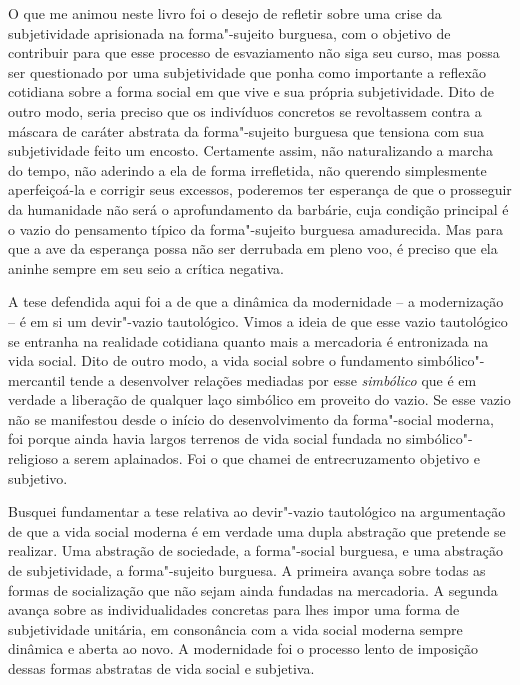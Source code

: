 O que me animou neste livro foi o desejo de refletir sobre uma crise da
subjetividade aprisionada na forma"-sujeito burguesa, com o objetivo de
contribuir para que esse processo de esvaziamento não siga seu curso,
mas possa ser questionado por uma subjetividade que ponha como
importante a reflexão cotidiana sobre a forma social em que vive e sua
própria subjetividade. Dito de outro modo, seria preciso que os
indivíduos concretos se revoltassem contra a máscara de caráter abstrata
da forma"-sujeito burguesa que tensiona com sua subjetividade feito um
encosto. Certamente assim, não naturalizando a marcha do tempo, não
aderindo a ela de forma irrefletida, não querendo simplesmente
aperfeiçoá-la e corrigir seus excessos, poderemos ter esperança de que o
prosseguir da humanidade não será o aprofundamento da barbárie, cuja
condição principal é o vazio do pensamento típico da forma"-sujeito
burguesa amadurecida. Mas para que a ave da esperança possa não ser
derrubada em pleno voo, é preciso que ela aninhe sempre em seu seio a
crítica negativa.

A tese defendida aqui foi a de que a dinâmica da
modernidade -- a modernização -- é em si um devir"-vazio tautológico.
Vimos a ideia de que esse vazio tautológico se entranha na
realidade cotidiana quanto mais a mercadoria é entronizada na vida
social. Dito de outro modo, a vida social sobre o fundamento
simbólico"-mercantil tende a desenvolver relações mediadas por esse
\emph{simbólico} que é em verdade a liberação de qualquer laço simbólico
em proveito do vazio. Se esse vazio não se manifestou desde o início do
desenvolvimento da forma"-social moderna, foi porque ainda havia largos
terrenos de vida social fundada no simbólico"-religioso a serem
aplainados. Foi o que chamei de entrecruzamento objetivo e subjetivo.

Busquei fundamentar a tese relativa ao devir"-vazio tautológico na
argumentação de que a vida social moderna é em verdade uma dupla
abstração que pretende se realizar. Uma abstração de sociedade, a
forma"-social burguesa, e uma abstração de subjetividade, a forma"-sujeito
burguesa. A primeira avança sobre todas as formas de socialização que
não sejam ainda fundadas na mercadoria. A segunda avança sobre as
individualidades concretas para lhes impor uma forma de subjetividade
unitária, em consonância com a vida social moderna sempre dinâmica e
aberta ao novo. A modernidade foi o processo lento de imposição dessas
formas abstratas de vida social e subjetiva.

